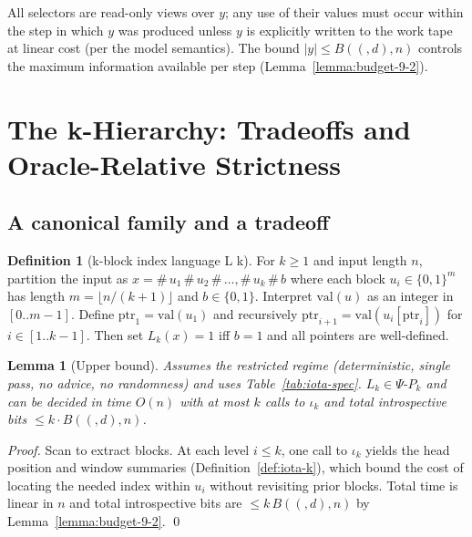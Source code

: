 \documentclass[11pt]{article}
\let\oldlog\log
\renewcommand{\log}{\oldlog_2}
\newtheorem{lemma}[theorem]{Lemma}
\theoremstyle{plain}
\theoremstyle{definition}
\newtheorem{definition}[theorem]{Definition}
\newcommand{\bits}{\{0,1\}}
\newcommand{\B}[2]{B(#1,#2)}  %
\begin{document}
All selectors are read-only views over $y$; any use of their values must occur within the step in which $y$ was produced unless $y$ is explicitly written to the work tape at linear cost (per the model semantics). The bound $|y|\le \B(d,n)$ controls the maximum information available per step (Lemma~\ref{lemma:budget-9-2}).


\section{The k-Hierarchy: Tradeoffs and Oracle-Relative Strictness}

\subsection{A canonical family and a tradeoff}

\begin{definition}[k-block index language L k]
\label{def:Lk}
For $k\ge1$ and input length $n$, partition the input as $x=\#\,u_1\,\#\,u_2\,\#\,\ldots,\#\,u_k\,\#\,b$ where each block $u_i\in\bits^{m}$ has length $m=\lfloor n/(k{+}1)\rfloor$ and $b\in\bits$. Interpret $\mathrm{val}(u)$ as an integer in $[0..m{-}1]$. Define $\mathrm{ptr}_1=\mathrm{val}(u_1)$ and recursively $\mathrm{ptr}_{i+1}=\mathrm{val}(u_{i}[\mathrm{ptr}_i])$ for $i\in[1..k{-}1]$. Then set $L_k(x)=1$ iff $b=1$ and all pointers are well-defined.
\end{definition}

\begin{lemma}[Upper bound]
\label{lem:Lk-upper}
Assumes the restricted regime (deterministic, single pass, no advice, no randomness) and uses Table~\ref{tab:iota-spec}.
$L_k\in \Psi\text{-}P_k$ and can be decided in time $O(n)$ with at most $k$ calls to $\iota_k$ and total introspective bits $\le k\cdot \B(d,n)$.
\end{lemma}
\begin{proof}
Scan to extract blocks. At each level $i\le k$, one call to $\iota_k$ yields the head position and window summaries (Definition~\ref{def:iota-k}), which bound the cost of locating the needed index within $u_i$ without revisiting prior blocks. Total time is linear in $n$ and total introspective bits are $\le k\,\B(d,n)$ by Lemma~\ref{lemma:budget-9-2}. \qed
\end{proof}
\end{document}
